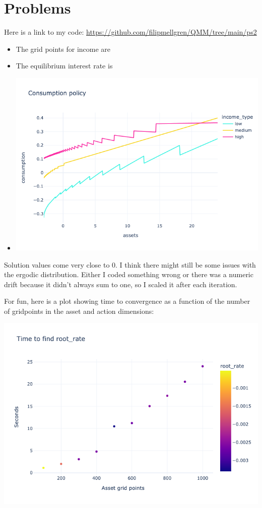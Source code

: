 \section{Problems}

\begin{questions}
\begin{solution}

Here is a link to my code: \url{https://github.com/filipmellgren/QMM/tree/main/ps2}

\begin{itemize}
	\item The grid points for income are 
	\item The equilibrium interest rate is 
	\item \includegraphics[scale=0.5]{figures/consumption_by_income.png}
\end{itemize}

Solution values come very close to 0. I think there might still be some issues with the ergodic distribution. Either I coded something wrong or there was a numeric drift because it didn't always sum to one, so I scaled it after each iteration.

For fun, here is a plot showing time to convergence as a function of the number of gridpoints in the asset and action dimensions:

\includegraphics[scale=0.5]{figures/time_to_converge.png}


\end{solution}
\end{questions}
